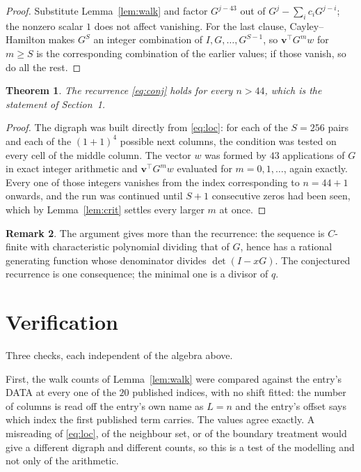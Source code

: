 \documentclass[11pt,a4paper]{article}
\theoremstyle{plain}
\newtheorem{theorem}{Theorem}
\theoremstyle{definition}
\newtheorem{remark}[theorem]{Remark}
\begin{document}
\begin{proof}
Substitute Lemma~\ref{lem:walk} and factor $G^{j-43}$ out of
$G^{j}-\sum_ic_iG^{j-i}$; the nonzero scalar $1$ does not affect
vanishing. For the last clause, Cayley--Hamilton makes $G^{S}$ an integer combination of
$I,G,\dots,G^{S-1}$, so $\mathbf{v}^{\!\top}G^{m}w$ for $m\ge S$ is the corresponding
combination of the earlier values; if those vanish, so do all the rest.
\end{proof}

\begin{theorem}
The recurrence \eqref{eq:conj} holds for every $n>44$, which is the statement of
Section~1.
\end{theorem}

\begin{proof}
The digraph was built directly from \eqref{eq:loc}: for each of the $S=256$ pairs and each
of the $(1+1)^{4}$ possible next columns, the condition was tested on every cell of
the middle column. The vector $w$ was formed by $43$ applications of $G$ in exact integer
arithmetic and $\mathbf{v}^{\!\top}G^{m}w$ evaluated for $m=0,1,\dots$, again exactly.
Every one of those integers vanishes from the index corresponding to $n=44+1$ onwards,
and the run was continued until $S+1$ consecutive zeros had been seen, which by
Lemma~\ref{lem:crit} settles every larger $m$ at once.
\end{proof}

\begin{remark}
The argument gives more than the recurrence: the sequence is $C$-finite with characteristic
polynomial dividing that of $G$, hence has a rational generating function whose denominator
divides $\det(I-xG)$. The conjectured recurrence is one consequence; the minimal one is a
divisor of $q$.
\end{remark}

\section{Verification}

Three checks, each independent of the algebra above.

First, the walk counts of Lemma~\ref{lem:walk} were compared against the entry's DATA at
every one of the $20$ published indices, with no shift fitted: the number of columns is
read off the entry's own name as $L=n$ and the entry's offset says which index the first
published term carries. The values agree exactly. A misreading of \eqref{eq:loc}, of the
neighbour set, or of the boundary treatment would give a different digraph and different
counts, so this is a test of the modelling and not only of the arithmetic.
\end{document}
